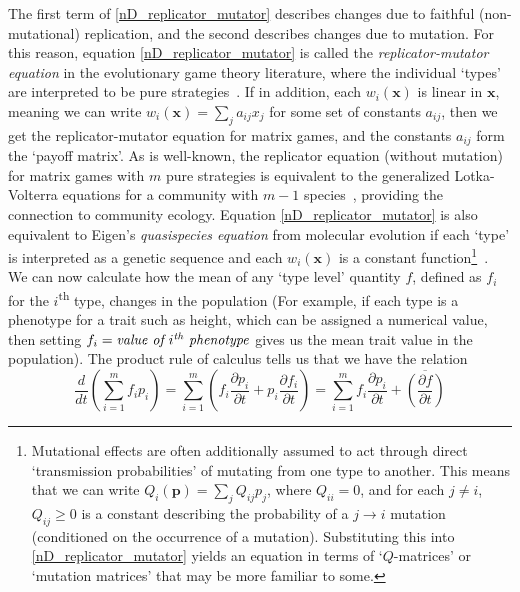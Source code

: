 The first term of \eqref{nD_replicator_mutator} describes changes due to faithful (non-mutational) replication, and the second describes changes due to mutation. For this reason, equation \eqref{nD_replicator_mutator} is called the \emph{replicator-mutator equation} in the evolutionary game theory literature, where the individual `types' are interpreted to be pure strategies~\citep{hofbauer_evolutionary_1998,page_unifying_2002,cressman_replicator_2014}. If in addition, each $w_i(\mathbf{x})$ is linear in $\mathbf{x}$, meaning we can write $w_i(\mathbf{x}) = \sum_{j}a_{ij}x_j$ for some set of constants $a_{ij}$, then we get the replicator-mutator equation for matrix games, and the constants $a_{ij}$ form the `payoff matrix'. As is well-known, the replicator equation (without mutation) for matrix games with $m$ pure strategies is equivalent to the generalized Lotka-Volterra equations for a community with $m-1$ species~\citep{hofbauer_evolutionary_1998}, providing the connection to community ecology.  Equation \eqref{nD_replicator_mutator} is also equivalent to Eigen's \emph{quasispecies equation} from molecular evolution if each `type' is interpreted as a genetic sequence and each $w_i(\mathbf{x})$ is a constant function\footnote{Mutational effects are often additionally assumed to act through direct `transmission probabilities' of mutating from one type to another. This means that we can write $Q_i(\mathbf{p}) = \sum_j Q_{ij}p_j$, where $Q_{ii} = 0$, and for each $j \neq i$, $Q_{ij} \geq0$ is a constant describing the probability of a $j \to i$ mutation (conditioned on the occurrence of a mutation). Substituting this into \eqref{nD_replicator_mutator} yields an equation in terms of `$Q$-matrices' or `mutation matrices' that may be more familiar to some.}~\citep{page_unifying_2002}. We can now calculate how the mean of any `type level' quantity $f$, defined as $f_i$ for the $i$\textsuperscript{th} type, changes in the population (For example, if each type is a phenotype for a trait such as height, which can be assigned a numerical value, then setting $f_i = \textit{value of $i\textsuperscript{th}$ phenotype}$ gives us the mean trait value in the population). The product rule of calculus tells us that we have the relation
\begin{equation}
\label{product_rule_for_nD_price}
\frac{d}{dt}\left(\sum\limits_{i=1}^{m}f_ip_i\right) = \sum\limits_{i=1}^{m}\left(f_i\frac{\partial p_i}{\partial t} + p_i\frac{\partial f_i}{\partial t}\right) = \sum\limits_{i=1}^{m}f_i\frac{\partial p_i}{\partial t} + \overline{\left(\frac{\partial f}{\partial t}\right)}
\end{equation}
